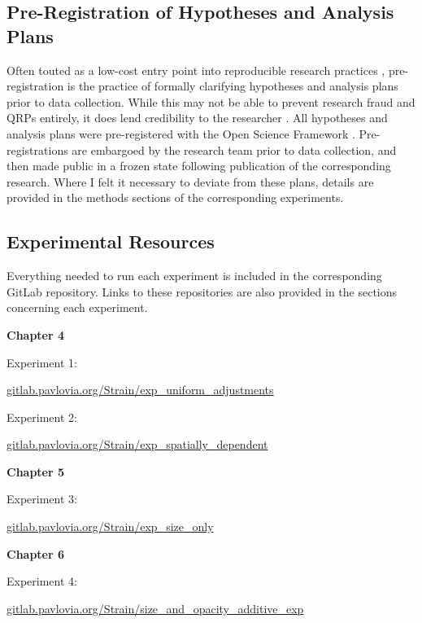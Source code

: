 \documentclass[../main.tex]{subfiles}
\begin{document}
\subsection{Pre-Registration of Hypotheses and Analysis
Plans}\label{pre-registration-of-hypotheses-and-analysis-plans}

Often touted as a low-cost entry point into reproducible research
practices \cite{logg_2021}, pre-registration is the practice of formally
clarifying hypotheses and analysis plans prior to data collection. While
this may not be able to prevent research fraud and QRPs entirely, it
does lend credibility to the researcher \cite{simmons_2021}. All
hypotheses and analysis plans were pre-registered with the Open Science
Framework \cite{OSF}. Pre-registrations are embargoed by the research
team prior to data collection, and then made public in a frozen state
following publication of the corresponding research. Where I felt it
necessary to deviate from these plans, details are provided in the
methods sections of the corresponding experiments.

\subsection{Experimental Resources}\label{experimental-resources}

Everything needed to run each experiment is included in the
corresponding GitLab repository. Links to these repositories are also
provided in the sections concerning each experiment.

\textbf{Chapter 4}

Experiment 1:

\href{https://gitlab.pavlovia.org/Strain/exp_uniform_adjustments}{gitlab.pavlovia.org/Strain/exp\_uniform\_adjustments}

Experiment 2:

\href{https://gitlab.pavlovia.org/Strain/exp_spatially_dependent}{gitlab.pavlovia.org/Strain/exp\_spatially\_dependent}

\textbf{Chapter 5}

Experiment 3:

\href{https://gitlab.pavlovia.org/Strain/exp_size_only}{gitlab.pavlovia.org/Strain/exp\_size\_only}

\textbf{Chapter 6}

Experiment 4:

\href{https://gitlab.pavlovia.org/Strain/size_and_opacity_additive_exp}{gitlab.pavlovia.org/Strain/size\_and\_opacity\_additive\_exp}
\end{document}

